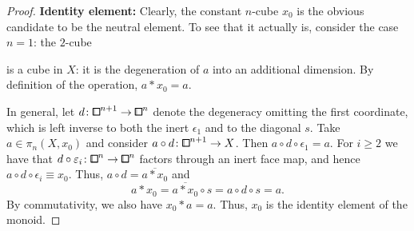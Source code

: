 \begin{proof}
\textbf{Identity element:}
Clearly, the constant $n$-cube $x_0$ is the obvious candidate to be the neutral element.
To see that it actually is, consider the case $n=1$:
the $2$-cube
\begin{center}
\end{center}
is a cube in $X$: it is the degeneration of $a$ into an additional dimension.
By definition of the operation, $a*x_0 = a$.

In general, let $d\colon{\bbox}^{n+1}\to{\bbox}^n$ denote the degeneracy omitting the first coordinate,
which is left inverse to both the inert $\epsilon_1$ and to the diagonal $s$.
Take $a\in\pi_n(X,x_0)$ and consider $a\circ d\colon{\bbox}^{n+1}\to X$.
Then $a\circ d\circ\epsilon_1 = a$.
For $i\geq 2$ we have that $d\circ\epsilon_i\colon{\bbox}^n\to{\bbox}^n$ factors through an inert face map, and hence $a\circ d\circ\epsilon_i \equiv x_0$.
Thus, $a\circ d = \overline{a*x_0}$ and
\[
    a*x_0 = \overline{a*x_0}\circ s = a\circ d\circ s = a.
\]
By commutativity, we also have $x_0*a = a$.
Thus, $x_0$ is the identity element of the monoid.


\end{proof}
